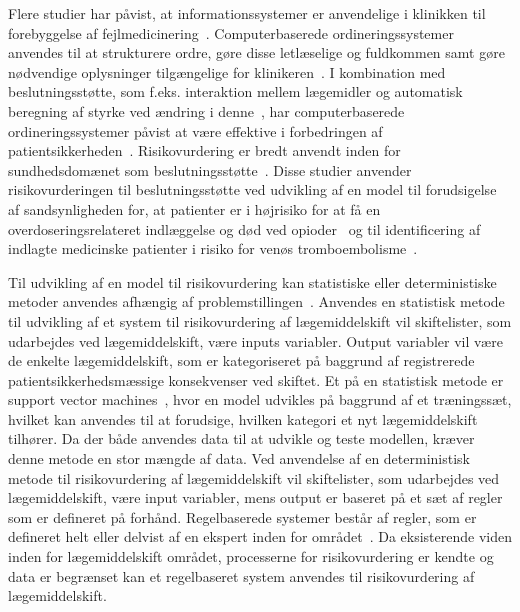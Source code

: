 Flere studier har påvist, at informationssystemer er anvendelige i klinikken til forebyggelse af fejlmedicinering~\citep{Agrawal2009,  Stenner2010, Fischer2008, Simpson2008, Kaushal2002, Bates2000a}. Computerbaserede ordineringssystemer anvendes til at strukturere ordre, gøre disse letlæselige og fuldkommen samt gøre nødvendige oplysninger tilgængelige for klinikeren~\citep{Agrawal2009,Bates2000a}. I kombination med beslutningsstøtte, som f.eks. interaktion mellem lægemidler og automatisk beregning af styrke ved ændring i denne~\citep{Agrawal2009}, har computerbaserede ordineringssystemer påvist at være effektive i forbedringen af patientsikkerheden~\citep{Agrawal2009, Bates2000a}. Risikovurdering er bredt anvendt inden for sundhedsdomænet som beslutningsstøtte~\citep{Geissert2018, Rawshani2018,Barbar2010}. Disse studier anvender risikovurderingen til beslutningsstøtte ved udvikling af en model til forudsigelse af sandsynligheden for, at patienter er i højrisiko for at få en overdoseringsrelateret indlæggelse og død ved opioder~\citep{Geissert2018} og til identificering af indlagte medicinske patienter i risiko for venøs tromboembolisme~\citep{Barbar2010}.

Til udvikling af en model til risikovurdering kan statistiske eller deterministiske metoder anvendes afhængig af problemstillingen~\citep{Boyko1990,Kirchsteiger1999}. Anvendes en statistisk metode til udvikling af et system til risikovurdering af lægemiddelskift vil skiftelister, som udarbejdes ved lægemiddelskift, være inputs variabler. Output variabler vil være de enkelte lægemiddelskift, som er kategoriseret på baggrund af registrerede patientsikkerhedsmæssige konsekvenser ved skiftet. Et på en statistisk metode er support vector machines~\citep{Koivu2018},
hvor en model udvikles på baggrund af et træningssæt, hvilket kan anvendes til at forudsige, hvilken kategori et nyt lægemiddelskift tilhører. Da der både anvendes data til at udvikle og teste modellen, kræver denne metode en stor mængde af data. Ved anvendelse af en deterministisk metode til risikovurdering af lægemiddelskift vil skiftelister, som udarbejdes ved lægemiddelskift, være input variabler, mens output er baseret på et sæt af regler som er defineret på forhånd. Regelbaserede systemer består af regler, som er defineret helt eller delvist af en ekspert inden for området~\citep{Crina2008}. Da eksisterende viden inden for lægemiddelskift området, processerne for risikovurdering er kendte og data er begrænset kan et regelbaseret system anvendes til risikovurdering af lægemiddelskift. 

